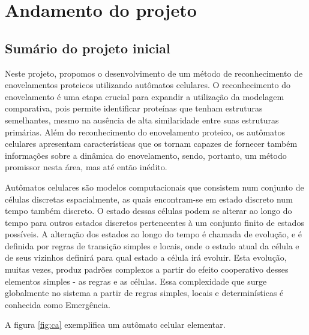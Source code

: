 \chapter{Andamento do projeto}\label{ch:introducao}
\section{Sumário do projeto inicial}
Neste projeto, propomos o desenvolvimento de um método de reconhecimento de enovelamentos proteicos utilizando autômatos celulares. O reconhecimento do enovelamento é uma etapa crucial para expandir a utilização da modelagem comparativa, pois permite identificar proteínas que tenham estruturas semelhantes, mesmo na ausência de alta similaridade entre suas estruturas primárias. Além do reconhecimento do enovelamento proteico, os autômatos celulares apresentam características que os tornam capazes de fornecer também informações sobre a dinâmica do enovelamento, sendo, portanto, um método promissor nesta área, mas até então inédito.

Autômatos celulares são modelos computacionais que consistem num conjunto de células discretas espacialmente, as quais encontram-se em estado discreto num tempo também discreto. O estado dessas células podem se alterar ao longo do tempo para outros estados discretos pertencentes à um conjunto finito de estados possíveis. A alteração dos estados ao longo do tempo é chamada de evolução, e é definida por regras de transição simples e locais, onde o estado atual da célula e de seus vizinhos definirá para qual estado a célula irá evoluir. Esta evolução, muitas vezes, produz padrões complexos a partir do efeito cooperativo desses elementos simples - as regras e as células. Essa complexidade que surge globalmente  no sistema a partir de regras simples, locais e determinísticas é conhecida como Emergência.

A figura \ref{fig:ca} exemplifica um autômato celular elementar.
 

